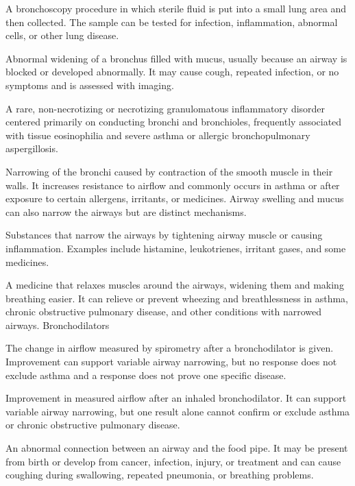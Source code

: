  A bronchoscopy procedure in which sterile fluid is put into a small lung area and then collected. The sample can be tested for infection, inflammation, abnormal cells, or other lung disease.

 Abnormal widening of a bronchus filled with mucus, usually because an airway is blocked or developed abnormally. It may cause cough, repeated infection, or no symptoms and is assessed with imaging.

 A rare, non-necrotizing or necrotizing granulomatous inflammatory disorder centered primarily on conducting bronchi and bronchioles, frequently associated with tissue eosinophilia and severe asthma or allergic bronchopulmonary aspergillosis.

 Narrowing of the bronchi caused by contraction of the smooth muscle in their walls. It increases resistance to airflow and commonly occurs in asthma or after exposure to certain allergens, irritants, or medicines. Airway swelling and mucus can also narrow the airways but are distinct mechanisms.

 Substances that narrow the airways by tightening airway muscle or causing inflammation. Examples include histamine, leukotrienes, irritant gases, and some medicines.

 A medicine that relaxes muscles around the airways, widening them and making breathing easier. It can relieve or prevent wheezing and breathlessness in asthma, chronic obstructive pulmonary disease, and other conditions with narrowed airways.
\synonyms
Bronchodilators

 The change in airflow measured by spirometry after a bronchodilator is given. Improvement can support variable airway narrowing, but no response does not exclude asthma and a response does not prove one specific disease.

 Improvement in measured airflow after an inhaled bronchodilator. It can support variable airway narrowing, but one result alone cannot confirm or exclude asthma or chronic obstructive pulmonary disease.

 An abnormal connection between an airway and the food pipe. It may be present from birth or develop from cancer, infection, injury, or treatment and can cause coughing during swallowing, repeated pneumonia, or breathing problems.

